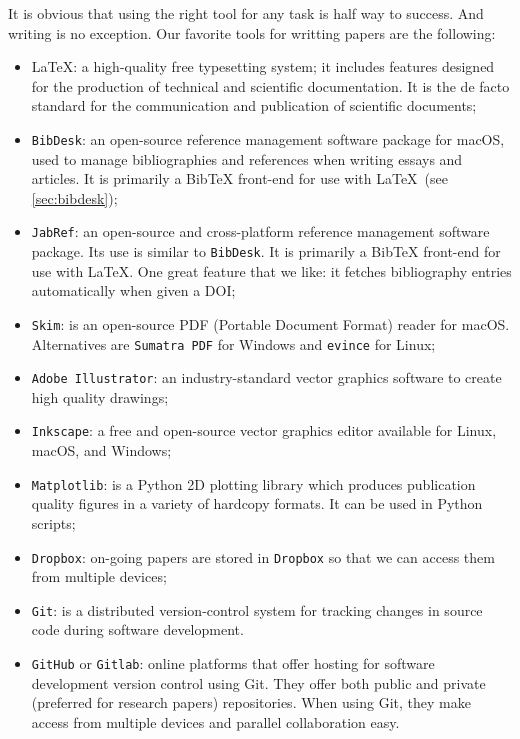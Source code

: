 \documentclass[authoryear,3p,times,preprint,review,fleqn]{elsarticle}
\numberwithin{equation}{section}
\theoremstyle{remark}
\begin{document}
It is obvious that using the right tool for any task is half way to success. And writing is no exception. Our favorite tools for writting papers are the following:

\begin{itemize}
\item \LaTeX:  a high-quality free typesetting system; it includes features designed for the production of technical and scientific documentation. It is the de facto standard for the communication and publication of scientific documents; 
\item \texttt{BibDesk}: an open-source reference management software package for macOS, used to manage bibliographies and references when writing essays and articles. It is primarily a BibTeX front-end for use with \LaTeX\ (see \cref{sec:bibdesk});
\item \texttt{JabRef}:  an open-source and cross-platform reference management software package. Its use is similar to \texttt{BibDesk}. It is primarily a BibTeX front-end for use with \LaTeX. One great feature that we like: it fetches bibliography entries automatically when given a DOI;
\item \texttt{Skim}: is an open-source PDF (Portable Document Format) reader for macOS. Alternatives are \texttt{Sumatra PDF} for Windows and \texttt{evince} for Linux;
\item \texttt{Adobe Illustrator}: an industry-standard vector graphics software to create high quality drawings;
\item \texttt{Inkscape}: a free and open-source vector graphics editor available for Linux, macOS, and Windows;
\item \texttt{Matplotlib}: is a Python 2D plotting library which produces publication quality figures in a variety of hardcopy formats. It can be used in Python scripts;
\item \texttt{Dropbox}: on-going papers are stored in \texttt{Dropbox} so that we can access them from multiple devices;
\item \texttt{Git}: is a distributed version-control system for tracking changes in source code during software development.
\item \texttt{GitHub} or \texttt{Gitlab}: online platforms that offer hosting for software development version control using Git. They offer both public and private (preferred for research papers) repositories. When using Git, they make access from multiple devices and parallel collaboration easy.
\end{itemize}
\end{document}
